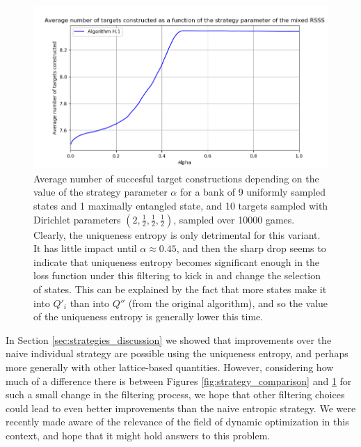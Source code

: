 \begin{figure}[h!]
    \centering
    \includegraphics[scale=0.65]{images/locc_counter.png}
    \caption{Average number of succesful target constructions depending on the value of the strategy parameter $\alpha$ for a bank of 9 uniformly sampled states and 1 maximally entangled state, and 10 targets sampled with Dirichlet parameters $\left(2, \frac{1}{2}, \frac{1}{2}, \frac{1}{2}\right)$, sampled over 10000 games. Clearly, the uniqueness entropy is only detrimental for this variant. It has little impact until $\alpha \approx 0.45$, and then the sharp drop seems to indicate that uniqueness entropy becomes significant enough in the loss function under this filtering to kick in and change the selection of states. This can be explained by the fact that more states make it into $Q'_i$ than into $Q''$ (from the original algorithm), and so the value of the uniqueness entropy is generally lower this time.}
    \label{fig:variant_results}
\end{figure}

In Section \ref{sec:strategies_discussion} we showed that improvements over the naive individual strategy are possible using the uniqueness entropy, and perhaps more generally with other lattice-based quantities. However, considering how much of a difference there is between Figures \ref{fig:strategy_comparison} and \ref{fig:variant_results} for such a small change in the filtering process, we hope that other filtering choices could lead to even better improvements than the naive entropic strategy. We were recently made aware of the relevance of the field of dynamic optimization in this context, and hope that it might hold answers to this problem.